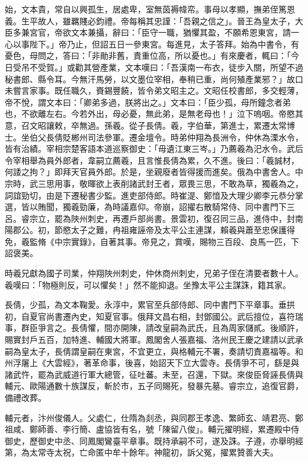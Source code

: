 \begin{pinyinscope}
 始，文本貴，常自以興孤生，居處卑，室無茵褥幃帟。事母以孝顯，撫弟侄篤恩義。生平故人，雖羈賤必鈞禮。帝每稱其忠謹：「吾親之信之」。晉王為皇太子，大臣多兼宮官，帝欲文本兼攝，辭曰：「臣守一職，猶懼其盈，不願希恩東宮，請一心以事陛下。」帝乃止，但詔五日一參東宮。每進見，太子答拜。始為中書令，有憂色，母問之，答曰：「非勛非舊，責重位高，所以憂也。」有來慶者，輒曰：「今日受吊不受賀。」或勸其營產業，文本嘆曰：「吾漢南一布衣，徒步入關，所望不過秘書郎、縣令耳。今無汗馬勞，以文墨位宰相，奉稍已重，尚何殖產業邪？」故口未嘗言家事。既任職久，賚錫豐饒，皆令弟文昭主之。文昭任校書郎，多交輕薄，帝不悅，謂文本曰：「卿弟多過，朕將出之。」文本曰：「臣少孤，母所鐘念者弟也，不欲離左右。今若外出，母必憂，無此弟，是無老母也！」泣下嗚咽。帝愍其意，召文昭讓敕，卒無過。孫羲。從子長倩。羲，字伯華，第進士，累遷太常博士。坐伯父長倩貶郴州司法參軍。遷金壇令。時弟仲翔為長洲令，仲休為溧水令，皆有治績。宰相宗楚客語本道巡察御史：「毋遺江東三岑。」乃薦羲為汜水令。武后令宰相舉為員外郎者，韋嗣立薦羲，且言惟長倩為累，久不進。後曰：「羲誠材，何諉之拘？」即拜天官員外郎。於是，坐親廢者皆得援而進矣。俄為中書舍人。中宗時，武三思用事，敬暉欲上表削諸武封王者，眾畏三思，不敢為草，獨羲為之，詞誼勁切，由是下遷秘書少監。進吏部侍郎。時崔湜、鄭愔及大理少卿李元恭分掌選，皆以賄聞，獨羲勁廉，為時議嘉仰。帝崩，詔擢右散騎常侍、同中書門下三呂。睿宗立，罷為陜州刺史，再遷戶部尚書。景雲初，復召同三品，進侍中，封南陽郡公。初，節愍太子之難，冉祖雍誣帝及太平公主連謀，賴羲與蕭至忠保護得免，羲監脩《中宗實錄》，自著其事。帝見之，賞嘆，賜物三百段、良馬一匹，下詔褒美。



 時羲兄獻為國子司業，仲翔陜州刺史，仲休商州刺史，兄弟子侄在清要者數十人。羲嘆曰：「物極則反，可以懼矣！」然不能抑退。坐豫太平公主謀誅，籍其家。



 長倩，少孤，為文本鞠愛。永淳中，累官至兵部侍郎、同中書門下平章事。垂拱初，自夏官尚書遷內史，知夏官事。俄拜文昌右相，封鄧國公。武后擅位，喜符瑞事，群臣爭言之。長倩懼，間亦開陳，請改皇嗣為武氏，且為周家儲貳。後順許，賜實封戶五百，加特進、輔國大將軍。鳳閣舍人張嘉福、洛州民王慶之建請以武承嗣為皇太子，長倩謂皇嗣在東宮，不宜更立，與格輔元不署，奏請切責嘉福等。和州浮屠上《大雲經》，著革命事，後喜，始詔天下立大雲寺。長倩爭不可，繇是與諸武忤，罷為武威道行軍大總管，征吐蕃。未至，召還，下獄。來俊臣脅誣長倩與輔元、歐陽通數十族謀反，斬於市，五子同賜死，發暴先墓。睿宗立，追復官爵，備禮改葬。



 輔元者，汴州俊儀人。父處仁，仕隋為剡丞，與同郡王孝逸、繁師玄、靖君亮、鄭祖咸、鄭師善、李行簡、盧協皆有名，號「陳留八俊」。輔元擢明經，累遷殿中侍御史，歷御史中丞、同鳳閣鸞臺平章事。既持承嗣不可，遂及誅。子遵，亦舉明經第，為太常寺太祝，亡命匿中牟十餘年。神龍初，訴父冤，擢累贊善大夫。




\end{pinyinscope}
